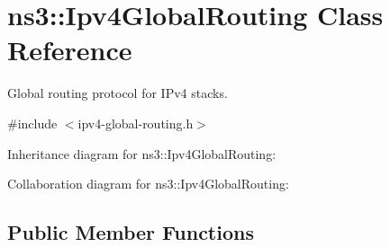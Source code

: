 \hypertarget{classns3_1_1Ipv4GlobalRouting}{}\section{ns3\+:\+:Ipv4\+Global\+Routing Class Reference}
\label{classns3_1_1Ipv4GlobalRouting}


Global routing protocol for I\+Pv4 stacks.  




{\ttfamily \#include $<$ipv4-\/global-\/routing.\+h$>$}



Inheritance diagram for ns3\+:\+:Ipv4\+Global\+Routing\+:


Collaboration diagram for ns3\+:\+:Ipv4\+Global\+Routing\+:
\subsection*{Public Member Functions}
